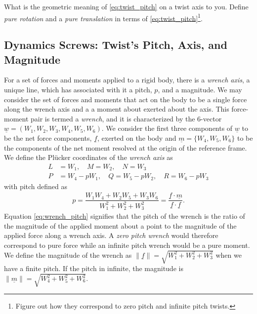 \noindent 
\begin{homework}
	What is the geometric meaning of \eqref{eq:twist_pitch} on a twist axis to you. Define \textit{pure rotation} and a \textit{pure translation} in terms of \eqref{eq:twist_pitch}\footnote{Figure out how they correspond to zero pitch and infinite pitch twists.}. 
\end{homework} 

\subsection{Dynamics Screws: Twist's Pitch, Axis, and Magnitude}
%
For a set of forces and moments applied to a rigid body, there is a \textit{wrench axis}, a unique line, which has associated with it a pitch, $p$, and a magnitude. We may consider the set of forces and moments that act on the body to be a single force along  the wrench axis and a a moment about exerted about the axis. This force-moment pair is termed a \textit{wrench}, and it is characterized by the 6-vector $\underline{w} = (W_1, W_2, W_3, W_4, W_5, W_6)$. We consider the first three components of $\underline{w}$ to be the net force components, $\underline{f}$, exerted on the body and $\underline{m}=\{W_4, W_5, W_6\}$ to be the components of the net moment resolved at the origin of the reference frame. We define the Pl\"ucker coordinates of the \textit{wrench axis} as 
%
\begin{subequations}
	\begin{align}
	L &= W_1, \quad M=W_2, \quad N = W_3 \\
	P&= W_4-pW_1, \quad Q = W_5 - pW_2, \quad R=W_6 - pW_3
	\end{align}
\end{subequations}
%
with pitch defined as
%
\begin{align}
	p = \dfrac{W_1 W_4 + W_2 W_5 + W_3 W_6}{W_1^2 + W_2^2+W_3^2} = \dfrac{\underline{f} \cdot \underline{m}}{\underline{f} \cdot \underline{f}}.
	\label{eq:wrench_pitch}
\end{align}
%
Equation \eqref{eq:wrench_pitch} signifies that the pitch of the wrench is the ratio of the magnitude of the applied moment about a point to the magnitude of the applied force along a wrench axis. A \textit{zero pitch wrench}  would therefore correspond to pure force while an infinite pitch wrench would be a pure moment. We define the magnitude of the wrench as $\|\underline{f}\| = \sqrt{W_1^2 + W_2^2 + W_3^2}$ when we have a finite pitch. If the pitch in infinite, the magnitude is $\|\underline{m}\| = \sqrt{W_4^2 + W_5^2 + W_6^2}$.

